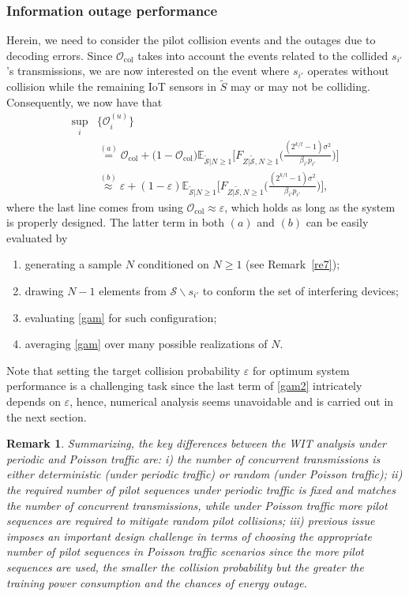 \documentclass[10pt,journal,a4paper]{IEEEtran}
\newtheorem{remark}{Remark}
\begin{document}
	\subsubsection{Information outage performance}
	Herein, we need to consider the pilot collision events and the outages due to decoding errors.
	Since $\mathcal{O}_\mathrm{col}$ takes into account the events related to the collided $s_{i'}$'s transmissions, we are now interested on the event where $s_{i'}$ operates without collision while the remaining IoT sensors in $\tilde{S}$ may or may not be colliding. 
	Consequently, we now have that
	\begin{align}
	\sup_i&\{\mathcal{O}_i^{(u)}\}\nonumber\\
	&\stackrel{(a)}{=} \mathcal{O}_\mathrm{col}\!+\!\big(1\!-\!\mathcal{O}_\mathrm{col}\big)\mathbb{E}_{\tilde{\mathcal{S}}|N\ge 1}\bigg[F_{Z|\tilde{\mathcal{S}},N\ge 1}\Big(\frac{(2^{k/t}\!-\!1)\sigma^2}{\beta_{i'}p_{i'}}\Big)\bigg]\nonumber\\
	&\stackrel{(b)}{\approx} \varepsilon\!+\!(1-\varepsilon)\mathbb{E}_{\tilde{\mathcal{S}}|N\ge 1}\bigg[F_{Z|\tilde{\mathcal{S}},N\ge 1}\Big(\frac{(2^{k/t}\!-1)\sigma^2}{\beta_{i'}p_{i'}}\Big)\bigg],\label{gam2}
	\end{align}
	where the last line comes from using $\mathcal{O}_{\mathrm{col}}\approx\varepsilon$, which holds as long as the system is properly designed. The latter term in both $(a)$ and $(b)$ can be easily  evaluated by 
	\begin{enumerate}
		\item generating a sample $N$ conditioned on $N\ge 1$ (see Remark~\ref{re7});
		\item drawing $N-1$ elements from $\mathcal{S}\backslash s_{i'}$ to conform the set of interfering devices;
		\item evaluating \eqref{gam} for such configuration;
		\item averaging \eqref{gam} over many possible realizations of $N$.
	\end{enumerate}
	Note that setting the target collision  probability $\varepsilon$ for optimum system performance is a challenging task since the last term of \eqref{gam2} intricately depends  on $\varepsilon$, hence, numerical analysis seems unavoidable and is carried out in the next section.
	\begin{remark}\label{re8}
	Summarizing, the key differences between the WIT analysis under periodic and Poisson traffic are: i) the number of concurrent transmissions is either deterministic (under periodic traffic) or random (under Poisson traffic); ii) the required number of pilot sequences under periodic traffic is fixed and matches the number of concurrent transmissions, while under Poisson traffic more pilot sequences are required to mitigate random pilot collisions; iii) previous issue imposes an important design challenge in terms of choosing the appropriate number of pilot sequences in Poisson traffic scenarios since the more pilot sequences are used, the smaller the collision probability but the greater the training power consumption and the chances of energy outage.
	\end{remark}	
\end{document}
